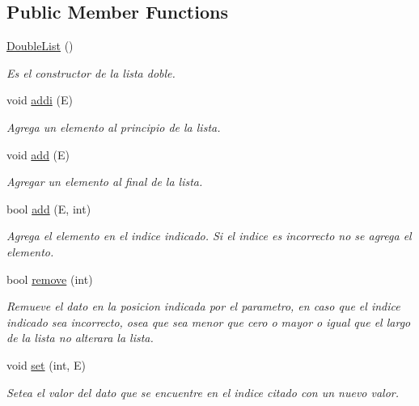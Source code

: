 \subsection*{Public Member Functions}
\begin{DoxyCompactItemize}
\item 
\hyperlink{class_double_list_ab54db9c718c7188f9413ef2b9982dd43}{Double\-List} ()
\begin{DoxyCompactList}\small\item\em Es el constructor de la lista doble. \end{DoxyCompactList}\item 
void \hyperlink{class_double_list_a621684e61b8d9d41cd107174d9877b1e}{addi} (E)
\begin{DoxyCompactList}\small\item\em Agrega un elemento al principio de la lista. \end{DoxyCompactList}\item 
void \hyperlink{class_double_list_adb96e6908d3d564722225b848350aa82}{add} (E)
\begin{DoxyCompactList}\small\item\em Agregar un elemento al final de la lista. \end{DoxyCompactList}\item 
bool \hyperlink{class_double_list_a84e3bb8be7d67b43dd3b63d5a47f80ed}{add} (E, int)
\begin{DoxyCompactList}\small\item\em Agrega el elemento en el indice indicado. Si el indice es incorrecto no se agrega el elemento. \end{DoxyCompactList}\item 
bool \hyperlink{class_double_list_a844c2c4c3b8260bd58ab94307359fb62}{remove} (int)
\begin{DoxyCompactList}\small\item\em Remueve el dato en la posicion indicada por el parametro, en caso que el indice indicado sea incorrecto, osea que sea menor que cero o mayor o igual que el largo de la lista no alterara la lista. \end{DoxyCompactList}\item 
void \hyperlink{class_double_list_a3c95ac3c3190b347c4a343776264bf67}{set} (int, E)
\begin{DoxyCompactList}\small\item\em Setea el valor del dato que se encuentre en el indice citado con un nuevo valor. \end{DoxyCompactList}\item 

\end{DoxyCompactItemize}
